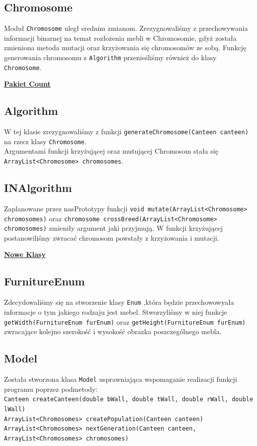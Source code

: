 \documentclass{article}
\begin{document}
\subsection{Chromosome}
\indent Moduł \verb|Chromosome| uległ srednim zmianom.
Zrezygnowaliśmy z przechowywania informacji binarnej na temat rozłożenia mebli w Chromosomie, gdyż została zmieniona metoda mutacji oraz krzyżowania się chromosomów ze sobą. Funkcję generowania chromosomu z \verb|Algorithm| przenieśliśmy również do klasy \verb|Chromosome|.
\begin{center}
\vspace{3mm}
\underline{\huge\textbf{{Pakiet Count}}}
\end{center}
\subsection{Algorithm}
\indent W tej klasie zrezygnowaliśmy z funkcji \verb|generateChromosome(Canteen canteen)| na rzecz klasy \verb|Chromosome|. \\Argumentami funkcji krzyżującej oraz mutującej Chromosom stała się \verb|ArrayList<Chromosome> chromosomes|.
\subsection{INAlgorithm}
\indent Zaplanowane przez nasPrototypy funkcji \verb|void mutate(ArrayList<Chromosome> chromosomes)| oraz \verb|chromosome crossBreed(ArrayList<Chromosome> chromosomes)| zmieniły argument jaki przyjmują. W funkcji krzyżującej postanowiliśmy zwracać chromosom powstały z krzyżowania i mutacji.
\begin{center}
\vspace{3mm}
\underline{\huge\textbf{{Nowe Klasy}}}
\end{center}
\subsection{FurnitureEnum}
\indent Zdecydowaliśmy się na stworzenie klasy \verb|Enum| ,która będzie przechowowyała informacje o tym jakiego rodzaju jest mebel. Stworzyliśmy w niej funkcje \verb|getWidth(FurnitureEnum furEnum)| oraz \verb|getHeight(FurnitureEnum furEnum)| zwracające kolejno szerokość i wysokość obrazka poszczególnego mebla.
\subsection{Model}
\indent Została stworzona klasa \verb|Model| usprawniająca wspomaganie realizacji funkcji programu poprzez podmetody:\\
\indent \verb|Canteen createCanteen(double bWall, double tWall, double rWall, double lWall)|\\
\indent \verb|ArrayList<Chromosomes> createPopulation(Canteen canteen)| \\
\indent \verb|ArrayList<Chromosomes> nextGeneration(Canteen canteen, ArrayList<Chromosomes> chromosomes)|\\
\newpage
\end{document}
